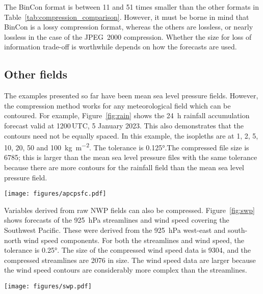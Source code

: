 \documentclass[12pt,a4paper]{article}
\begin{document}
The BinCon format is between 11 and 51 times smaller than the other formats in
Table~\ref{tab:compression_comparison}. However, it must be borne in mind that
BinCon is a lossy compression format, whereas the others are lossless, or
nearly lossless in the case of the JPEG~2000 compression. Whether the size for
loss of information trade-off is worthwhile depends on how the forecasts are
used.

\subsection*{Other fields}
\label{sec:other_fields}

The examples presented so far have been mean sea level pressure fields.
However, the compression method works for any meteorological field which can be
contoured. For example, Figure~\ref{fig:rain} shows the \SI{24}{\hour} rainfall
accumulation forecast valid at 1200\,UTC, 5 January 2023. This also demonstrates
that the contours need not be equally spaced. In this example, the isopleths are
at 1, 2, 5, 10, 20, 50 and \SI{100}{\kg\per\m\squared}. The tolerance is
\ang{0.125}.The compressed file size is \SI{6785}{\byte}; this is larger than
the mean sea level pressure files with the same tolerance because there are
more contours for the rainfall field than the mean sea level pressure field.

\begin{figure*}
\centering
\texttt{[image: figures/apcpsfc.pdf]}
\caption{\label{fig:rain}\SI{24}{\hour} rainfall accumulation.}
\end{figure*}

Variables derived from raw NWP fields can also be compressed.
Figure~\ref{fig:swp} shows forecasts of the \SI{925}{\hecto\Pa} streamlines and
wind speed covering the Southwest Pacific. These were derived from the
\SI{925}{\hecto\Pa} west-east and south-north wind speed components. For both
the streamlines and wind speed, the tolerance is \ang{0.25}. The size of the
compressed wind speed data is \SI{9304}{\byte}, and the compressed streamlines
are \SI{2076}{\byte} in size. The wind speed data are larger because the wind
speed contours are considerably more complex than the streamlines.

\begin{figure*}
\centering
\texttt{[image: figures/swp.pdf]}
\caption{\label{fig:swp}\SI{24}{\hour} forecast of \SI{925}{\hecto\Pa}
stream function and wind speed for the Southwest Pacific valid
for 1200\,UTC, 5 January 2023. Wind speed units are knots.}
\end{figure*}
\end{document}
